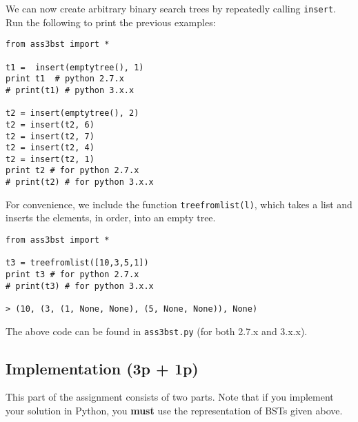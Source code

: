 \documentclass{article}
\begin{document}
We can now create arbitrary binary search trees by repeatedly calling \lstinline{insert}. Run the following to print the previous examples:

\begin{lstlisting}
from ass3bst import *

t1 =  insert(emptytree(), 1)
print t1  # python 2.7.x
# print(t1) # python 3.x.x

t2 = insert(emptytree(), 2)
t2 = insert(t2, 6)
t2 = insert(t2, 7)
t2 = insert(t2, 4)
t2 = insert(t2, 1)
print t2 # for python 2.7.x
# print(t2) # for python 3.x.x

\end{lstlisting}

For convenience, we include the function \lstinline{treefromlist(l)}, which takes a list and inserts the elements, in order, into an empty tree.

\begin{lstlisting}
from ass3bst import *

t3 = treefromlist([10,3,5,1])
print t3 # for python 2.7.x
# print(t3) # for python 3.x.x

> (10, (3, (1, None, None), (5, None, None)), None)
\end{lstlisting}

The above code can be found in {\tt ass3bst.py} (for both 2.7.x and 3.x.x).

\subsection{Implementation (3p + 1p)}

This part of the assignment consists of two parts.
Note that if you implement your solution in Python, you {\bf must} use the representation of BSTs given above. 
\end{document}
